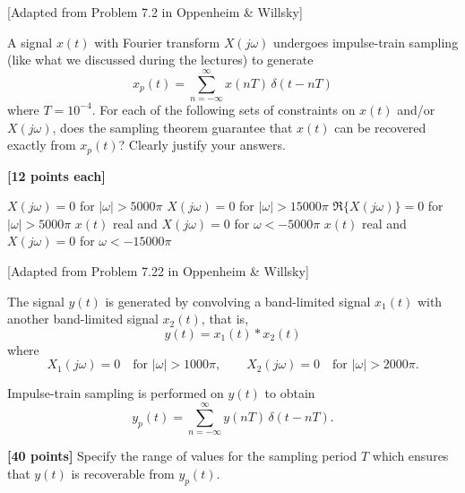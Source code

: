\documentclass{ee102_pset}
\author{\rule{3cm}{0.4pt}}
\begin{document}
 [Adapted from Problem 7.2 in Oppenheim \& Willsky]

A signal $x(t)$ with Fourier transform $X(j\omega)$ undergoes impulse-train sampling (like what we discussed during the lectures) to generate
\[
x_p(t) = \sum_{n=-\infty}^{\infty} x(nT)\,\delta(t-nT)
\]
where $T = 10^{-4}$. For each of the following sets of constraints on $x(t)$ and/or $X(j\omega)$, does the sampling theorem guarantee
that $x(t)$ can be recovered exactly from $x_p(t)$? Clearly justify your answers.

\textbf{[12 points each]}

\problempart $X(j\omega) = 0$ for $\lvert \omega \rvert > 5000\pi$
\problempart $X(j\omega) = 0$ for $\lvert \omega \rvert > 15000\pi$
\problempart $\Re\{X(j\omega)\} = 0$ for $\lvert \omega \rvert > 5000\pi$
\problempart $x(t)$ real and $X(j\omega) = 0$ for $\omega < -5000\pi$
\problempart $x(t)$ real and $X(j\omega) = 0$ for $\omega < -15000\pi$

 [Adapted from Problem 7.22 in Oppenheim \& Willsky]

The signal $y(t)$ is generated by convolving a band-limited signal
$x_1(t)$ with another band-limited signal $x_2(t)$, that is,
\[
y(t) = x_1(t) * x_2(t)
\]
where
\[
X_1(j\omega) = 0 \quad \text{for } \lvert \omega \rvert > 1000\pi,
\qquad
X_2(j\omega) = 0 \quad \text{for } \lvert \omega \rvert > 2000\pi.
\]

Impulse-train sampling is performed on $y(t)$ to obtain
\[
y_p(t) = \sum_{n=-\infty}^{\infty} y(nT)\,\delta(t-nT).
\]

\problempart \textbf{[40 points]} Specify the range of values for the sampling period $T$ which ensures that
$y(t)$ is recoverable from $y_p(t)$.
\end{document}

